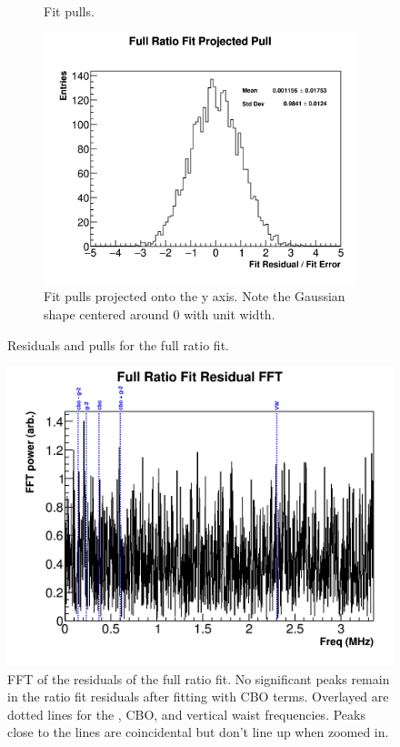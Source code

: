 \begin{figure}[H]
\begin{subfigure}[]{0.45\textwidth}
	    \caption{Fit pulls.}
    \end{subfigure}%
    \vspace{4mm}
    \begin{subfigure}[]{0.7\textwidth}
	    \centering
		\includegraphics[width=\textwidth]{fitPull_projected}
	    \caption{Fit pulls projected onto the y axis. Note the Gaussian shape centered around 0 with unit width.}
    \end{subfigure}
\caption[fitResidual]{Residuals and pulls for the full ratio fit.}
\label{fig:fitResidual}
\end{figure}

\begin{figure}[]
	\centering
	\includegraphics[width=\textwidth]{FFT_ratioCBOFit}
    \caption[FFT_ratioCBOFit]{FFT of the residuals of the full ratio fit. No significant peaks remain in the ratio fit residuals after fitting with CBO terms. Overlayed are dotted lines for the \gmtwo, CBO, and vertical waist frequencies. Peaks close to the lines are coincidental but don't line up when zoomed in.}
    \label{fig:FFT_ratioCBOFit}
\end{figure}

